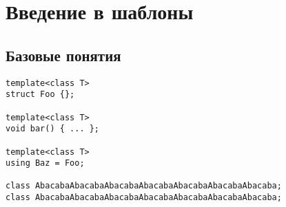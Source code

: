 \chapter{Введение в шаблоны}

\section{Базовые понятия}
\begin{verbatim}
template<class T>
struct Foo {};

template<class T>
void bar() { ... };

template<class T>
using Baz = Foo;

class AbacabaAbacabaAbacabaAbacabaAbacabaAbacabaAbacaba;
class AbacabaAbacabaAbacabaAbacabaAbacabaAbacabaAbacaba;
\end{verbatim}
\lipsum
